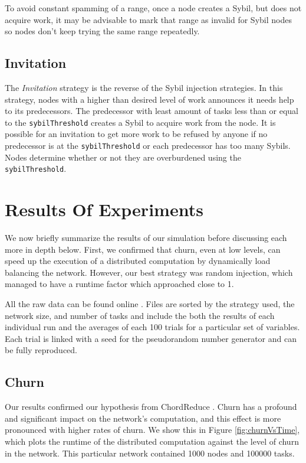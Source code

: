 To avoid constant spamming of a range, once a node creates a Sybil, but does not acquire work, it may be advisable to mark that range as invalid for Sybil nodes so nodes don't keep trying the same range repeatedly. 


\subsection{Invitation}
The \textit{Invitation} strategy is the reverse of the Sybil injection strategies.
In  this strategy, nodes with a higher than desired level of work announces it needs help to its predecessors.
The predecessor with least amount of tasks less than or equal to the \texttt{sybilThreshold} creates a Sybil to acquire work from the node.
It is possible for an invitation to get more work to be refused by anyone if no  predecessor is at the \texttt{sybilThreshold} or each predecessor has too many Sybils.
Nodes determine whether or not they are overburdened using the \texttt{sybilThreshold}.



\section{Results Of Experiments}
\label{sec:autonomous-results}

We now briefly summarize the results of our simulation before discussing each more in depth below.
First, we confirmed that churn, even at low levels, can speed up the execution of a distributed computation by dynamically load balancing the network.
However, our best strategy was random injection, which managed to have a runtime factor which approached close to 1.

All the raw data can be found online \cite{simulation-data}.
Files are sorted by the strategy used, the network size,  and number of tasks and include the both the results of each individual run and the averages of each 100 trials for a particular set of variables.
Each trial is linked with a seed for the pseudorandom number generator and can be fully reproduced.


\subsection{Churn}


Our results confirmed our hypothesis from ChordReduce \cite{chordreduce}.
Churn has a profound and significant impact on the network's computation, and this effect is more pronounced with higher rates of churn.
We show this in Figure \ref{fig:churnVsTime}, which plots the runtime of the distributed computation against the level of churn in the network.
This particular network contained 1000 nodes and 100000 tasks.


